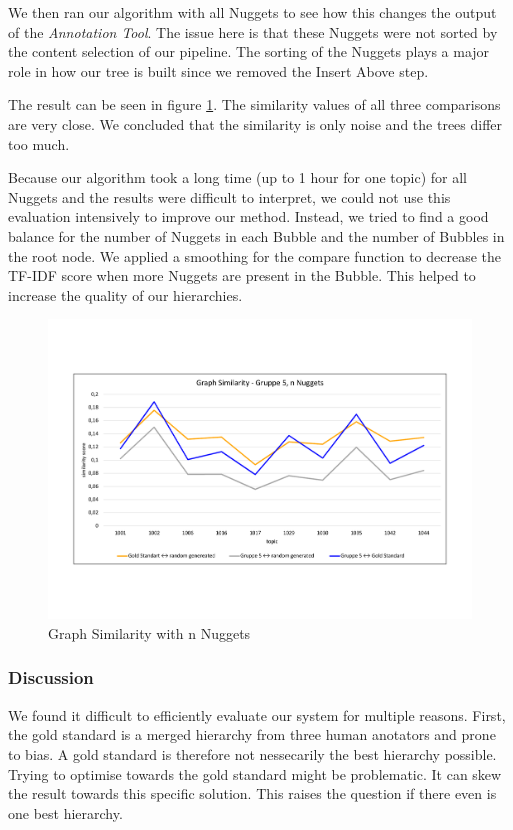 We then ran our algorithm with all Nuggets to see how this changes the output of the \textit{Annotation Tool}. The issue here is that these Nuggets were not sorted by the content selection of our pipeline. The sorting of the Nuggets plays a major role in how our tree is built since we removed the Insert Above step.

The result can be seen in figure \ref{fig:graphn}. The similarity values of all three comparisons are very close. We concluded that the similarity is only noise and the trees differ too much.

Because our algorithm took a long time (up to 1 hour for one topic) for all Nuggets and the results were difficult to interpret, we could not use this evaluation intensively to improve our method. Instead, we tried to find a good balance for the number of Nuggets in each Bubble and the number of Bubbles in the root node. We applied a smoothing for the compare function to decrease the TF-IDF score when more Nuggets are present in the Bubble. This helped to increase the quality of our hierarchies.

\begin{figure}[H]
	\centering
	\includegraphics[trim= 0 130 0 130,width=\textwidth]{img/sim_v2.pdf}
	\caption{Graph Similarity with n Nuggets}
	\label{fig:graphn}
\end{figure}

\subsubsection{Discussion}

We found it difficult to efficiently evaluate our system for multiple reasons. First, the gold standard is a merged hierarchy from three human anotators and prone to bias. A gold standard is therefore not nessecarily the best hierarchy possible. Trying to optimise towards the gold standard might be problematic. It can skew the result towards this specific solution. This raises the question if there even is one best hierarchy.

